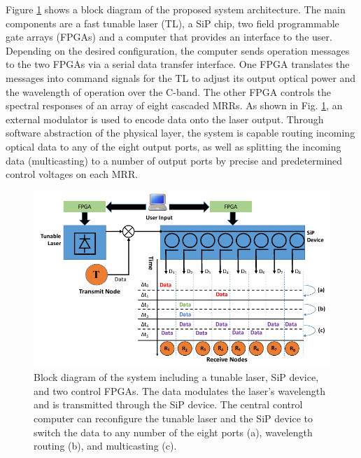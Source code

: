Figure \ref{fig1} shows a block diagram of the proposed system architecture. The main components are a fast tunable laser (TL), a SiP chip, two field programmable gate arrays (FPGAs) and a computer that provides an interface to the user. Depending on the desired configuration, the computer sends operation messages to the two FPGAs via a serial data transfer interface. One FPGA translates the messages into command signals for the TL to adjust its output optical power and the wavelength of operation over the C-band. The other FPGA controls the spectral responses of an array of eight cascaded MRRs. As shown in Fig. \ref{fig1}, an external modulator is used to encode data onto the laser output. Through software abstraction of the physical layer, the system is capable routing incoming optical data to any of the eight output ports, as well as splitting the incoming data (multicasting) to a number of output ports by precise and predetermined control voltages on each MRR. 

\begin{figure}[b]
\begin{center}
\includegraphics[width=13cm]{Chapter3/fig1.pdf}
\caption{Block diagram of the system including a tunable laser, SiP device, and two control FPGAs. The data modulates the laser's wavelength and is transmitted through the SiP device. The central control computer can reconfigure the tunable laser and the SiP device to switch the data to any number of the eight ports (a), wavelength routing (b), and multicasting (c).}
\label{fig1}
\end{center}
\vspace{-0.9cm}
\end{figure}

